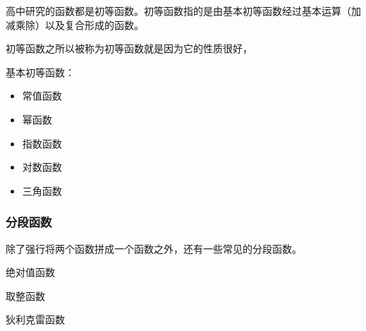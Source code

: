 高中研究的函数都是初等函数。初等函数指的是由基本初等函数经过基本运算（加减乘除）以及复合形成的函数。

初等函数之所以被称为初等函数就是因为它的性质很好，

基本初等函数：
\begin{itemize}
\item 常值函数
\item 幂函数
\item 指数函数
\item 对数函数
\item 三角函数
\end{itemize}

\subsubsection{分段函数}

除了强行将两个函数拼成一个函数之外，还有一些常见的分段函数。

绝对值函数

取整函数

狄利克雷函数
